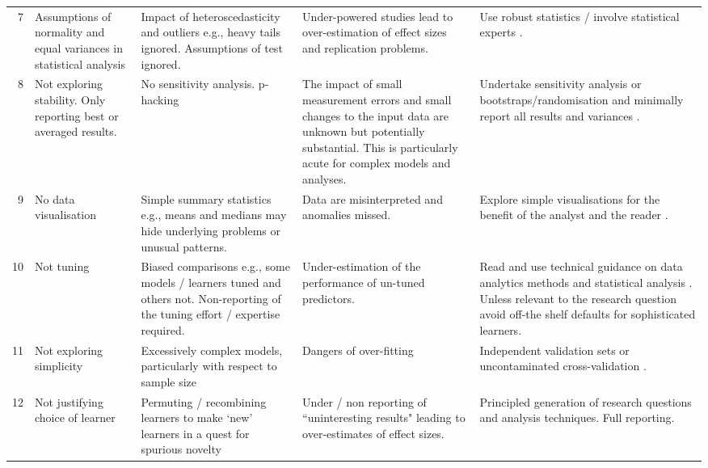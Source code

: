 \documentclass[preprint,10pt]{elsarticle}
\begin{document}
\begin{table}
\begin{center}
\begin{tabular}{|r|p{1.7cm}|p{2.3cm}|p{2.5cm}|p{3cm}|}
7  & Assumptions of normality and equal variances in statistical analysis & Impact of heteroscedasticity and outliers e.g., heavy tails ignored.  Assumptions of test ignored.  & Under-powered studies lead to over-estimation of effect sizes and replication problems. & Use robust statistics / involve statistical experts \cite{Kitc02,Wilc12}.\\
\rowcolor{gray!50}8 & Not exploring stability.  Only reporting best or averaged results. & No sensitivity analysis. p-hacking & The impact of small measurement errors and small changes to the input data are unknown but potentially substantial.  This is particularly acute for complex models and analyses. & Undertake sensitivity analysis or bootstraps/randomisation and minimally report all results and variances \cite{Manl97,Salt00}.\\
9 & No data visualisation & Simple summary statistics e.g., means and medians may hide underlying problems or unusual patterns. & Data are misinterpreted and anomalies missed. & Explore simple visualisations for the benefit of the analyst and the reader \cite{Mya09,Heal18}.\\
\rowcolor{gray!50}
10 & Not tuning & Biased comparisons e.g., some models / learners tuned and others not. Non-reporting of the tuning effort / expertise required. & Under-estimation of the performance of un-tuned predictors. & Read and use technical guidance on data analytics methods and statistical analysis \cite{Snoe12,fu2016}.  Unless relevant to the research question avoid off-the shelf defaults for sophisticated learners.\\
11 & Not exploring simplicity & Excessively complex models, particularly with respect to sample size  & Dangers of over-fitting & Independent validation sets or uncontaminated cross-validation \cite{Cawl10}. \\
\rowcolor{gray!50} 
12 & Not justifying choice of learner & Permuting / recombining learners to make `new' learners in a quest for spurious novelty & Under / non reporting of ``uninteresting results" leading to over-estimates of effect sizes. & Principled generation of research questions and analysis techniques. Full reporting. \\
\hline
\end{tabular}
\end{center}
\label{Tab:BadSmells}
\end{table}%
\end{document}
